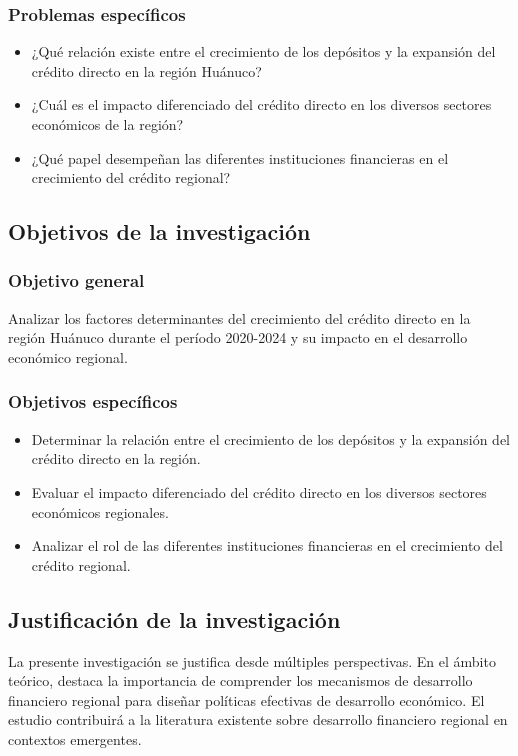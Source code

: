 \documentclass[12pt, a4paper]{article}
\begin{document}
\subsubsection{Problemas específicos}
\begin{itemize}
    \item ¿Qué relación existe entre el crecimiento de los depósitos y la expansión del crédito directo en la región Huánuco?
    \item ¿Cuál es el impacto diferenciado del crédito directo en los diversos sectores económicos de la región?
    \item ¿Qué papel desempeñan las diferentes instituciones financieras en el crecimiento del crédito regional?
\end{itemize}

\subsection{Objetivos de la investigación}

\subsubsection{Objetivo general}
Analizar los factores determinantes del crecimiento del crédito directo en la región Huánuco durante el período 2020-2024 y su impacto en el desarrollo económico regional.

\subsubsection{Objetivos específicos}
\begin{itemize}
    \item Determinar la relación entre el crecimiento de los depósitos y la expansión del crédito directo en la región.
    \item Evaluar el impacto diferenciado del crédito directo en los diversos sectores económicos regionales.
    \item Analizar el rol de las diferentes instituciones financieras en el crecimiento del crédito regional.
\end{itemize}

\subsection{Justificación de la investigación}

La presente investigación se justifica desde múltiples perspectivas. En el ámbito teórico, \textcite{Kumar2023} destaca la importancia de comprender los mecanismos de desarrollo financiero regional para diseñar políticas efectivas de desarrollo económico. El estudio contribuirá a la literatura existente sobre desarrollo financiero regional en contextos emergentes.
\end{document}
